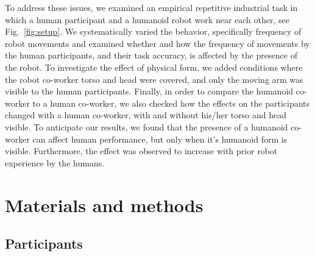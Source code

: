 To address these issues, we examined an empirical repetitive industrial task in which a human participant and a humanoid robot work near each other, see Fig.~\ref{fig:setup}. We systematically varied the behavior, specifically frequency of robot movements and examined whether and how the frequency of movements by the human participants, and their task accuracy, is affected by the presence of the robot. To investigate the effect of physical form, we added conditions where the robot co-worker torso and head were covered, and only the moving arm was visible to the human participants. Finally, in order to compare the humanoid co-worker to a human co-worker, we also checked how the effects on the participants changed with a human co-worker, with and without his/her torso and head visible. To anticipate our results, we found that the presence of a humanoid co-worker can affect human performance, but only when it's humanoid form is visible. Furthermore, the effect was observed to increase with prior robot experience by the humans.




\section{Materials and methods} \label{methods}

\subsection{Participants}

